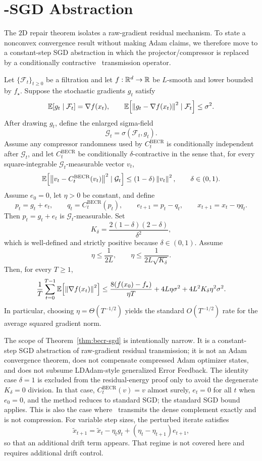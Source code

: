 \section{\BECR-SGD Abstraction}

The $2$D repair theorem isolates a raw-gradient residual mechanism. To state a
nonconvex convergence result without making Adam claims, we therefore move to a
constant-step SGD abstraction in which the projector/compressor is replaced by
a conditionally contractive \BECR\ transmission operator.

\begin{theorem}
\label{thm:becr-sgd}
Let $\{\mathcal F_t\}_{t\ge 0}$ be a filtration and let $f:\mathbb{R}^d\to\mathbb{R}$ be
$L$-smooth and lower bounded by $f_\star$. Suppose the stochastic gradients
$g_t$ satisfy
\[
\mathbb{E}[g_t\mid \mathcal F_t]=\nabla f(x_t),\qquad
\mathbb{E}\!\left[\left\lVert g_t-\nabla f(x_t) \right\rVert^2\mid \mathcal F_t\right]\le \sigma^2.
\]
After drawing $g_t$, define the enlarged sigma-field
\[
\mathcal G_t=\sigma(\mathcal F_t,g_t).
\]
Assume any compressor randomness used by $C_t^{\mathrm{BECR}}$ is conditionally
independent after $\mathcal G_t$, and let $C_t^{\mathrm{BECR}}$ be
conditionally $\delta$-contractive in the sense that, for every
square-integrable $\mathcal G_t$-measurable vector $v_t$,
\[
\mathbb{E}\!\left[\left\lVert v_t-C_t^{\mathrm{BECR}}(v_t) \right\rVert^2\mid \mathcal G_t\right]
\le (1-\delta)\left\lVert v_t \right\rVert^2,
\qquad \delta\in(0,1).
\]
Assume $e_0=0$, let $\eta>0$ be constant, and define
\[
p_t=g_t+e_t,\qquad
q_t=C_t^{\mathrm{BECR}}(p_t),\qquad
e_{t+1}=p_t-q_t,\qquad
x_{t+1}=x_t-\eta q_t.
\]
Then $p_t=g_t+e_t$ is $\mathcal G_t$-measurable. Set
\[
K_\delta=\frac{2(1-\delta)(2-\delta)}{\delta^2},
\]
which is well-defined and strictly positive because $\delta\in(0,1)$. Assume
\[
\eta\le \frac{1}{2L},
\qquad
\eta\le \frac{1}{2L\sqrt{K_\delta}}.
\]
Then, for every $T\ge 1$,
\[
\frac{1}{T}\sum_{t=0}^{T-1}\mathbb{E}\!\left[\left\lVert \nabla f(x_t) \right\rVert^2\right]
\le
\frac{8(f(x_0)-f_\star)}{\eta T}
+
4L\eta\sigma^2
+
4L^2K_\delta \eta^2\sigma^2.
\]
In particular, choosing $\eta=\Theta(T^{-1/2})$ yields the standard
$O(T^{-1/2})$ rate for the average squared gradient norm.
\end{theorem}

The scope of Theorem~\ref{thm:becr-sgd} is intentionally narrow. It is a
constant-step SGD abstraction of raw-gradient residual transmission; it is not
an Adam convergence theorem, does not compensate compressed Adam optimizer
states, and does not subsume LDAdam-style generalized Error Feedback. The
identity case $\delta=1$ is excluded from the residual-energy proof only to
avoid the degenerate $K_\delta=0$ division. In that case,
$C_t^{\mathrm{BECR}}(v)=v$ almost surely, $e_t=0$ for all $t$ when $e_0=0$,
and the method reduces to standard SGD; the standard SGD bound applies. This
is also the case where \BECR\ transmits the dense complement exactly and is not
compression. For variable step sizes, the perturbed iterate satisfies
\[
\tilde x_{t+1}
=
\tilde x_t-\eta_t g_t+(\eta_t-\eta_{t+1})e_{t+1},
\]
so that an additional drift term appears. That regime is not covered here and
requires additional drift control.
